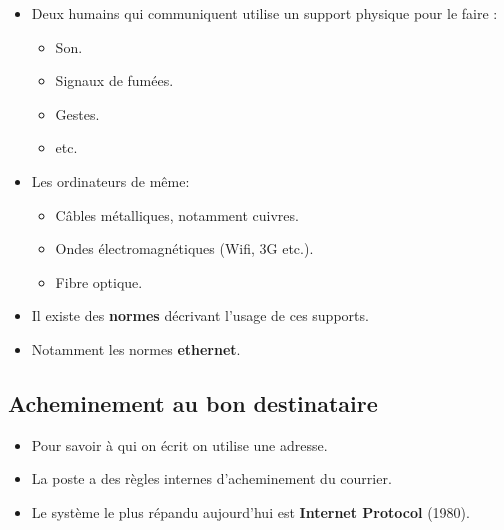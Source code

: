 \begin{slide}
	\begin{itemize}
		\item Deux humains qui communiquent utilise un support physique pour le faire :
 			\begin{itemize}
				\item Son. 
				\item Signaux de fumées.
				\item Gestes.
				\item etc.
			\end{itemize}
		\item Les ordinateurs de même:
			\begin{itemize}
				\item Câbles métalliques, notamment cuivres.
				\item Ondes électromagnétiques (Wifi, 3G etc.).
				\item Fibre optique. %
			\end{itemize} 
		\item Il existe des \textbf{normes} décrivant l'usage de ces supports.
		\item Notamment les normes \textbf{ethernet}.
	\end{itemize}
\end{slide}


\subsection{Acheminement au bon destinataire}

\begin{slide}
	\begin{itemize}
		\item Pour savoir à qui on écrit on utilise une adresse.
		\item La poste a des règles internes d'acheminement du courrier.
		\item Le système le plus répandu aujourd'hui est \textbf{Internet Protocol} (1980).
	\end{itemize}
\end{slide}

